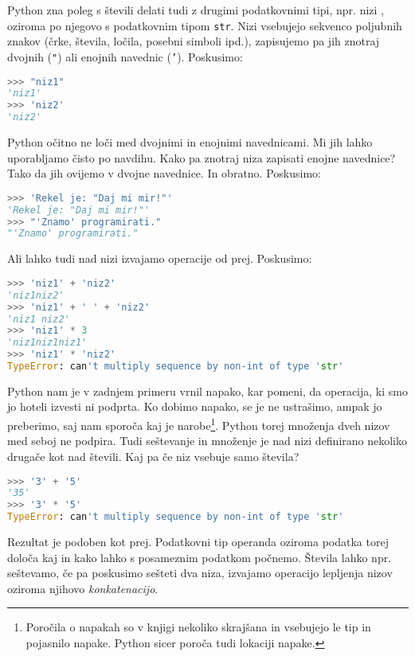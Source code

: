 Python zna poleg s števili delati tudi z drugimi podatkovnimi tipi, npr. nizi , oziroma po njegovo s podatkovnim tipom \texttt{str}. Nizi vsebujejo sekvenco poljubnih znakov (črke, števila, ločila, posebni simboli ipd.), zapisujemo pa jih znotraj dvojnih (\texttt{"}) ali enojnih navednic (\texttt{'}). Poskusimo:
\begin{lstlisting}[language=Python]
>>> "niz1"
'niz1'
>>> 'niz2'
'niz2'
\end{lstlisting}
Python očitno ne loči med dvojnimi in enojnimi navednicami. Mi jih lahko uporabljamo čisto po navdihu. Kako pa znotraj niza zapisati enojne navednice? Tako da jih ovijemo v dvojne navednice. In obratno. Poskusimo:
\begin{lstlisting}[language=Python]
>>> 'Rekel je: "Daj mi mir!"'
'Rekel je: "Daj mi mir!"'
>>> "'Znamo' programirati."
"'Znamo' programirati."
\end{lstlisting}
Ali lahko tudi nad nizi izvajamo operacije od prej. Poskusimo:
\begin{lstlisting}[language=Python]
>>> 'niz1' + 'niz2'
'niz1niz2'
>>> 'niz1' + ' ' + 'niz2'
'niz1 niz2'
>>> 'niz1' * 3
'niz1niz1niz1'
>>> 'niz1' * 'niz2'
TypeError: can't multiply sequence by non-int of type 'str'
\end{lstlisting}
Python nam je v zadnjem primeru vrnil napako, kar pomeni, da operacija, ki smo jo hoteli izvesti ni podprta. Ko dobimo napako, se je ne ustrašimo, ampak jo preberimo, saj nam sporoča kaj je narobe\footnote{Poročila o napakah so v knjigi nekoliko skrajšana in vsebujejo le tip in pojasnilo napake. Python sicer poroča tudi lokaciji napake.}. Python torej množenja dveh nizov med seboj ne podpira.
Tudi seštevanje in množenje je nad nizi definirano nekoliko drugače kot nad števili. Kaj pa če niz vsebuje samo števila?
\begin{lstlisting}[language=Python]
>>> '3' + '5'
'35'
>>> '3' * '5'
TypeError: can't multiply sequence by non-int of type 'str'
\end{lstlisting}
Rezultat je podoben kot prej. Podatkovni tip operanda oziroma podatka torej določa kaj in kako lahko s posameznim podatkom počnemo. Števila lahko npr. seštevamo, če pa poskusimo sešteti dva niza, izvajamo operacijo lepljenja nizov oziroma njihovo \emph{konkatenacijo}. 


